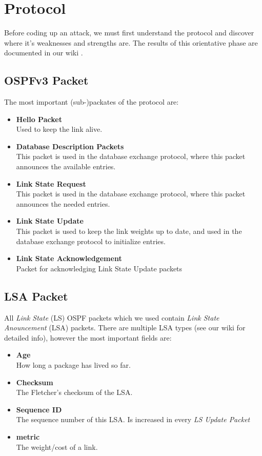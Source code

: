 \documentclass[11pt,a4paper,oneside]{article}
\newcommand{\lsection}[2]{\section{#1}\label{sec:#2}}
\newcommand{\lsubsection}[2]{\subsection{#1}\label{sec:#2}}
\begin{document}
    \lsection{Protocol}{protocol}
    		Before coding up an attack, we must first understand the protocol and discover where it's weaknesses and strengths are. The results of this orientative phase are documented in our wiki \cite{wiki}.
    		\lsubsection{OSPFv3 Packet}{ospfv3_packet}
			The most important (sub-)packates of the protocol are:
			\begin{itemize}
				\item \textbf{Hello Packet}\\
					Used to keep the link alive.
				\item \textbf{Database Description Packets}\\
					This packet is used in the database exchange protocol, where this packet announces the available entries.
				\item \textbf{Link State Request}\\
					This packet is used in the database exchange protocol, where this packet announces the needed entries.
				\item \textbf{Link State Update}\\
					This packet is used to keep the link weights up to date, and used in the database exchange protocol to initialize entries.
				\item \textbf{Link State Acknowledgement}\\
					Packet for acknowledging Link State Update packets
			\end{itemize}
		\lsubsection{LSA Packet}{lsa_packet}
			All \textit{Link State} (LS) OSPF packets which we used contain \textit{Link State Anouncement} (LSA) packets. There are multiple LSA types (see our wiki\cite{wiki} for detailed info), however the most important fields are:
			\begin{itemize}
				\item \textbf{Age}\\
					How long a package has lived so far.
				\item \textbf{Checksum}\\
					The Fletcher's checksum\cite{fletcher} of the LSA.
				\item \textbf{Sequence ID}\\
					The sequence number of this LSA. Is increased in every \textit{LS Update Packet}
				\item \textbf{metric}\\
					The weight/cost of a link.
			\end{itemize}
			
\end{document}
